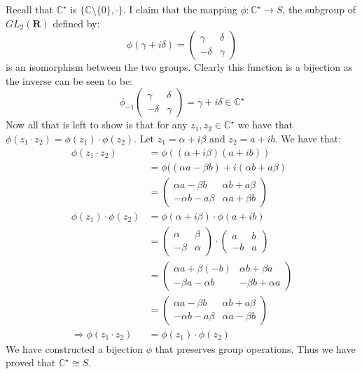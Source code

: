 \documentclass[a4paper, 11pt]{article}
\begin{document}
\noindent Recall that $\mathbb{C}^\star$ is $\{\mathbb{C}\setminus\{0\}, \cdot\}$. I claim that the mapping $\phi:\mathbb{C}^\star \rightarrow S$, the subgroup of $GL_2(\mathbf{R})$ defined by: 
	\begin{equation*}
		\phi(\gamma + i\delta) = \begin{pmatrix}
			\gamma & \delta \\ 
			-\delta & \gamma 
		\end{pmatrix}
	\end{equation*}
is an isomorphism between the two groups. Clearly this function is a bijection as the inverse can be seen to be: 
	\begin{equation*}
		\phi_{-1}\begin{pmatrix}
			\gamma & \delta \\ 
			-\delta & \gamma
		\end{pmatrix} = \gamma + i \delta \in \mathbb{C}^\star
	\end{equation*}
Now all that is left to show is that for any $z_1, z_2 \in \mathbb{C}^\star$ we have that $\phi(z_1\cdot z_2) = \phi(z_1) \cdot \phi(z_2)$. Let $z_1 = \alpha + i\beta$ and $z_2 = a + ib$. We have that: 
	\begin{align*}
		\phi(z_1 \cdot z_2) &= \phi((\alpha + i\beta)(a + ib)) \\ 
							&= \phi((\alpha a - \beta b) + i (\alpha b + a \beta) \\ 
							&= \begin{pmatrix}
								\alpha a - \beta b & \alpha b + a \beta \\ 
								-\alpha b - a\beta & \alpha a + \beta b 
							\end{pmatrix} \\ 
		\phi(z_1)\cdot \phi(z_2) 	&= \phi(\alpha + i\beta) \cdot \phi(a + ib) \\ 
									&= \begin{pmatrix}
										\alpha & \beta \\ 
										-\beta & \alpha 
									\end{pmatrix} \cdot \begin{pmatrix}
										a & b \\ 
										-b & a 
									\end{pmatrix}\\ 
							&= \begin{pmatrix}
								\alpha a + \beta(-b) & \alpha b + \beta a \\ 
								-\beta a - \alpha b & -\beta b + \alpha a 
							\end{pmatrix} \\ 
							&= \begin{pmatrix}
								\alpha a - \beta b & \alpha b + a \beta \\ 
								-\alpha b - a \beta & \alpha a - \beta b 
								\end{pmatrix} \\
		\Rightarrow \phi(z_1 \cdot z_2) &= \phi(z_1)\cdot \phi(z_2)						
	\end{align*}
We have constructed a bijection $\phi$ that preserves group operations. Thus we have proved that $\mathbb{C}^\star \cong S$. 
\end{document}
